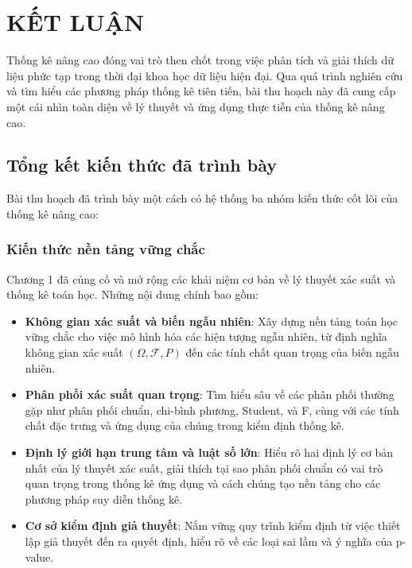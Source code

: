 \chapter*{KẾT LUẬN}

Thống kê nâng cao đóng vai trò then chốt trong việc phân tích và giải thích dữ liệu phức tạp trong thời đại khoa học dữ liệu hiện đại. Qua quá trình nghiên cứu và tìm hiểu các phương pháp thống kê tiên tiến, bài thu hoạch này đã cung cấp một cái nhìn toàn diện về lý thuyết và ứng dụng thực tiễn của thống kê nâng cao.

\section*{Tổng kết kiến thức đã trình bày}

Bài thu hoạch đã trình bày một cách có hệ thống ba nhóm kiến thức cốt lõi của thống kê nâng cao:

\subsection*{Kiến thức nền tảng vững chắc}

Chương 1 đã củng cố và mở rộng các khái niệm cơ bản về lý thuyết xác suất và thống kê toán học. Những nội dung chính bao gồm:

\begin{itemize}
    \item \textbf{Không gian xác suất và biến ngẫu nhiên}: Xây dựng nền tảng toán học vững chắc cho việc mô hình hóa các hiện tượng ngẫu nhiên, từ định nghĩa không gian xác suất $(\Omega, \mathcal{F}, P)$ đến các tính chất quan trọng của biến ngẫu nhiên.
    
    \item \textbf{Phân phối xác suất quan trọng}: Tìm hiểu sâu về các phân phối thường gặp như phân phối chuẩn, chi-bình phương, Student, và F, cùng với các tính chất đặc trưng và ứng dụng của chúng trong kiểm định thống kê.
    
    \item \textbf{Định lý giới hạn trung tâm và luật số lớn}: Hiểu rõ hai định lý cơ bản nhất của lý thuyết xác suất, giải thích tại sao phân phối chuẩn có vai trò quan trọng trong thống kê ứng dụng và cách chúng tạo nền tảng cho các phương pháp suy diễn thống kê.
    
    \item \textbf{Cơ sở kiểm định giả thuyết}: Nắm vững quy trình kiểm định từ việc thiết lập giả thuyết đến ra quyết định, hiểu rõ về các loại sai lầm và ý nghĩa của p-value.
\end{itemize}

